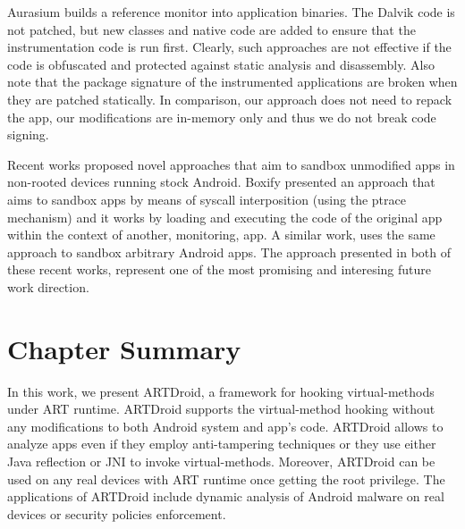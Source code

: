 Aurasium \cite{xu2012aurasium} builds a reference monitor into application binaries. The Dalvik code is not patched, but new classes and native code are added to ensure that the instrumentation code is run first. Clearly, such approaches are not effective if the code is obfuscated and protected against static analysis and disassembly. Also note that the package signature of the instrumented applications are broken when they are patched statically. In comparison, our approach does not need to repack the app, our modifications are in-memory only and thus we do not break code signing.

Recent works proposed novel approaches that aim to sandbox unmodified apps in non-rooted devices running stock Android. Boxify\cite{backes2015boxify} presented an approach that aims to sandbox apps by means of syscall interposition (using the ptrace mechanism) and it works by loading and executing the code of the original app within the context of another, monitoring, app. A similar work, \cite{bianchi2015njas} uses the same approach to sandbox arbitrary Android apps. The approach presented in both of these recent works, represent one of the most promising and interesing future work direction.

\section{Chapter Summary}
\label{sec:conclusion}
In this work, we present ARTDroid, a framework for hooking virtual-methods under ART runtime. ARTDroid supports the virtual-method hooking without any modifications to both Android system and app's code. ARTDroid allows to analyze apps even if they employ anti-tampering techniques or they use either Java reflection or JNI to invoke virtual-methods. Moreover, ARTDroid can be used on any real devices with ART runtime once getting the root privilege. The applications of ARTDroid include dynamic analysis of Android malware on real devices or security policies enforcement.








